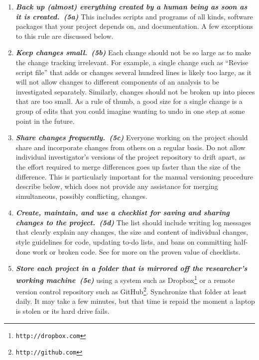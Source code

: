 \documentclass[10pt,letterpaper]{article}
\newcommand{\withurl}[2]{{#1}\footnote{{\texttt{#2}}}}
\newcommand{\practice}[2]{\textbf{\emph{{#2}~({#1})}}}
\begin{document}
\begin{enumerate}

\item

  \practice{5a}{Back up (almost) everything created by a human being
  as soon as it is created.} This includes scripts and programs of
  all kinds, software packages that your project depends on, and
  documentation. A few exceptions to this rule are discussed below.

\item

  \practice{5b}{Keep changes small.}  Each change should not be so
  large as to make the change tracking irrelevant. For example, a
  single change such as ``Revise script file'' that adds or changes
  several hundred lines is likely too large, as it will not allow
  changes to different components of an analysis to be investigated
  separately. Similarly, changes should not be broken up into pieces
  that are too small. As a rule of thumb, a good size for a single
  change is a group of edits that you could imagine wanting to undo in
  one step at some point in the future.

\item

  \practice{5c}{Share changes frequently.} Everyone working on the
  project should share and incorporate changes from others on a
  regular basis. Do not allow individual investigator's versions of
  the project repository to drift apart, as the effort required to
  merge differences goes up faster than the size of the
  difference. This is particularly important for the manual versioning
  procedure describe below, which does not provide any assistance for
  merging simultaneous, possibly conflicting, changes.

\item

  \practice{5d}{Create, maintain, and use a checklist for saving and
  sharing changes to the project.} The list should include writing
  log messages that clearly explain any changes, the size and content
  of individual changes, style guidelines for code, updating to-do
  lists, and bans on committing half-done work or broken code.  See
  \cite{gawande2011} for more on the proven value of checklists.

\item

  \practice{5e}{Store each project in a folder that is mirrored off
  the researcher's working machine} using a system such as
  \withurl{Dropbox}{http://dropbox.com} or a remote version control
  repository such as \withurl{GitHub}{http://github.com}.  Synchronize
  that folder at least daily. It may take a few minutes, but that time
  is repaid the moment a laptop is stolen or its hard drive fails.

\end{enumerate}
\end{document}
